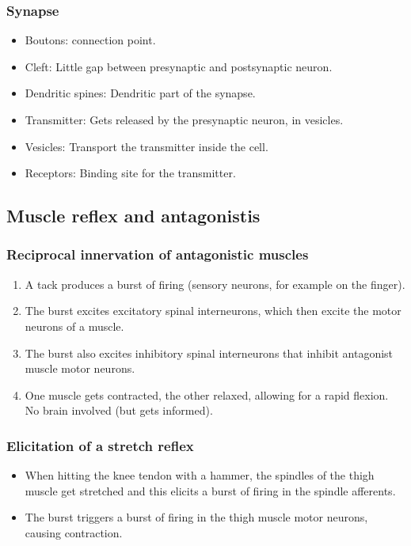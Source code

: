 \documentclass[a4paper, 12pt]{article}
\begin{document}
\subsubsection{Synapse}
\begin{itemize}[noitemsep,nolistsep]
	\item Boutons: connection point.
	\item Cleft: Little gap between presynaptic and postsynaptic neuron.
	\item Dendritic spines: Dendritic part of the synapse.
	\item Transmitter: Gets released by the presynaptic neuron, in vesicles.
	\item Vesicles: Transport the transmitter inside the cell.
	\item Receptors: Binding site for the transmitter.
\end{itemize}

\subsection{Muscle reflex and antagonistis}
\subsubsection{Reciprocal innervation of antagonistic muscles}
\begin{enumerate}
	\item A tack produces a burst of firing (sensory neurons, for example on the finger).
	\item The burst excites excitatory spinal interneurons, which then excite the motor neurons of a muscle.
	\item The burst also excites inhibitory spinal interneurons that inhibit antagonist muscle motor neurons.
	\item One muscle gets contracted, the other relaxed, allowing for a rapid flexion. No brain involved (but gets informed).
\end{enumerate}
\subsubsection{Elicitation of a stretch reflex}
\begin{itemize}[noitemsep,nolistsep]
	\item When hitting the knee tendon with a hammer, the spindles of the thigh muscle get stretched and this elicits a burst of firing in the spindle afferents.
	\item The burst triggers a burst of firing in the thigh muscle motor neurons, causing contraction.
\end{itemize}
\end{document}
